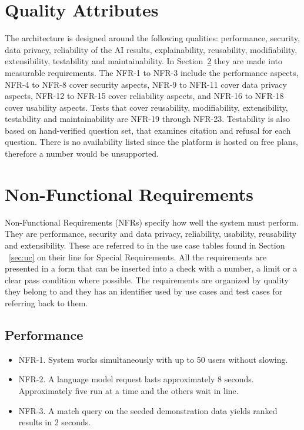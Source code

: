 \documentclass{FastFyp}
\begin{document}
\section{Quality Attributes}
The architecture is designed around the following qualities: performance, security, data privacy, reliability of the AI results, explainability, reusability, modifiability, extensibility, testability and maintainability. In Section~\ref{sec:nfr} they are made into measurable requirements. The NFR-1 to NFR-3 include the performance aspects, NFR-4 to NFR-8 cover security aspects, NFR-9 to NFR-11 cover data privacy aspects, NFR-12 to NFR-15 cover reliability aspects, and NFR-16 to NFR-18 cover usability aspects. Tests that cover reusability, modifiability, extensibility, testability and maintainability are NFR-19 through NFR-23. Testability is also based on hand-verified question set, that examines citation and refusal for each question. There is no availability listed since the platform is hosted on free plans, therefore a number would be unsupported.

\section{Non-Functional Requirements}\label{sec:nfr}
Non-Functional Requirements (NFRs) specify how well the system must perform. They are performance, security and data privacy, reliability, usability, reusability and extensibility. These are referred to in the use case tables found in Section ~\ref{sec:uc} on their line for Special Requirements. All the requirements are presented in a form that can be inserted into a check with a number, a limit or a clear pass condition where possible. The requirements are organized by quality they belong to and they has an identifier used by use cases and test cases for referring back to them.

\subsection{Performance}
\begin{itemize}
 \item NFR-1. System works simultaneously with up to 50 users without slowing.
 \item NFR-2. A language model request lasts approximately 8 seconds. Approximately five run at a time and the others wait in line.
 \item NFR-3. A match query on the seeded demonstration data yields ranked results in 2 seconds.
\end{itemize}
\end{document}
